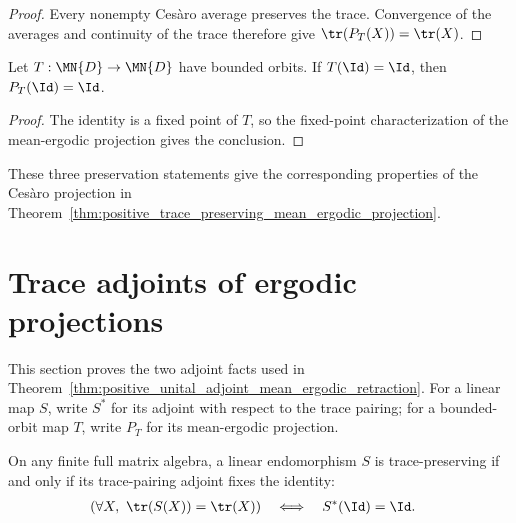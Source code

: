 \begin{proof}\leanok
    Every nonempty Ces\`aro average preserves the trace. Convergence of the
    averages and continuity of the trace therefore give
    $\tr(P_T(X))=\tr(X)$.
\end{proof}

\begin{theorem}
    \label{thm:unital_mean_ergodic_projection}
    \leanok
    Let $T:\MN{D}\to\MN{D}$ have bounded orbits. If $T(\Id)=\Id$, then
    $P_T(\Id)=\Id$.
\end{theorem}

\begin{proof}\leanok
    The identity is a fixed point of $T$, so the fixed-point characterization
    of the mean-ergodic projection gives the conclusion.
\end{proof}

These three preservation statements give the corresponding properties of the
Ces\`aro projection in
Theorem~\ref{thm:positive_trace_preserving_mean_ergodic_projection}.

\section{Trace adjoints of ergodic projections}

This section proves the two adjoint facts used in
Theorem~\ref{thm:positive_unital_adjoint_mean_ergodic_retraction}. For a linear
map $S$, write $S^*$ for its adjoint with respect to the trace pairing; for a
bounded-orbit map $T$, write $P_T$ for its mean-ergodic projection.

\begin{theorem}
    \label{thm:trace_preserving_iff_trace_adjoint_unital}
    \leanok
    On any finite full matrix algebra, a linear endomorphism $S$ is
    trace-preserving if and only if its trace-pairing adjoint fixes the
    identity:
    \begin{align}
        (\forall X,\ \tr(S(X))=\tr(X))
         & \quad\Longleftrightarrow\quad S^*(\Id)=\Id.
        \label{eq:channel_tp_adjoint_unital}
    \end{align}
\end{theorem}

